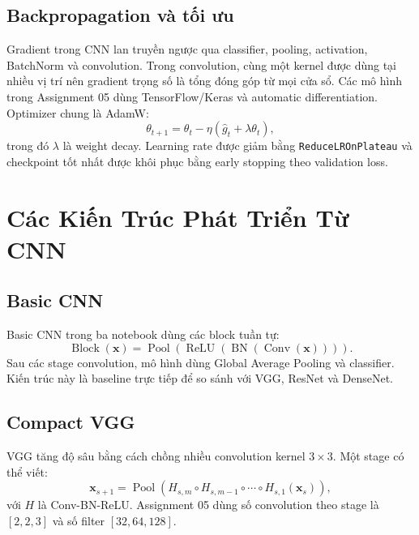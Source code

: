 \documentclass[12pt,a4paper]{report}
\begin{document}
\section{Backpropagation và tối ưu}
Gradient trong CNN lan truyền ngược qua classifier, pooling, activation, BatchNorm và convolution.
Trong convolution, cùng một kernel được dùng tại nhiều vị trí nên gradient trọng số là tổng đóng góp từ mọi cửa sổ.
Các mô hình trong Assignment 05 dùng TensorFlow/Keras và automatic differentiation.
Optimizer chung là AdamW:
\begin{equation}
    \theta_{t+1}=\theta_t-\eta\left(\hat{g}_t+\lambda\theta_t\right),
\end{equation}
trong đó $\lambda$ là weight decay.
Learning rate được giảm bằng \texttt{ReduceLROnPlateau} và checkpoint tốt nhất được khôi phục bằng early stopping theo validation loss.

\chapter{Các Kiến Trúc Phát Triển Từ CNN}

\section{Basic CNN}
Basic CNN trong ba notebook dùng các block tuần tự:
\begin{equation}
    \operatorname{Block}(\mathbf{x})=
    \operatorname{Pool}\left(
    \operatorname{ReLU}\left(
    \operatorname{BN}\left(
    \operatorname{Conv}(\mathbf{x})\right)\right)\right).
\end{equation}
Sau các stage convolution, mô hình dùng Global Average Pooling và classifier.
Kiến trúc này là baseline trực tiếp để so sánh với VGG, ResNet và DenseNet.

\section{Compact VGG}
VGG tăng độ sâu bằng cách chồng nhiều convolution kernel $3\times3$.
Một stage có thể viết:
\begin{equation}
    \mathbf{x}_{s+1}
    = \operatorname{Pool}
    \left(H_{s,m}\circ H_{s,m-1}\circ \cdots \circ H_{s,1}(\mathbf{x}_s)\right),
\end{equation}
với $H$ là Conv-BN-ReLU.
Assignment 05 dùng số convolution theo stage là $[2,2,3]$ và số filter $[32,64,128]$.
\end{document}
